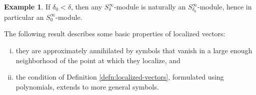 \documentclass[reqno]{amsart}
\theoremstyle{plain} \newtheorem{theorem} {Theorem}
\theoremstyle{definition} \newtheorem{definition} [theorem] {Definition}
\newtheorem{example} [theorem] {Example}
\theoremstyle{itplain} %
\numberwithin{equation}{section}
\numberwithin{theorem}{section}
\begin{document}
\begin{example}\label{example:delta-to-zero-module}
  If $\delta_0 < \delta$, then any $S^\infty_\delta$-module is naturally an $S^\infty_{\delta_0}$-module, hence in particular an $S^\infty_0$-module.
\end{example}


The following result describes some basic properties of localized vectors:
\begin{enumerate}[(i)]
\item they are approximately annihilated by symbols that vanish in a large enough neighborhood of the point at which they localize, and
\item the condition of Definition \ref{defn:localized-vectors}, formulated using polynomials, extends to more general symbols.
\end{enumerate}
\end{document}
